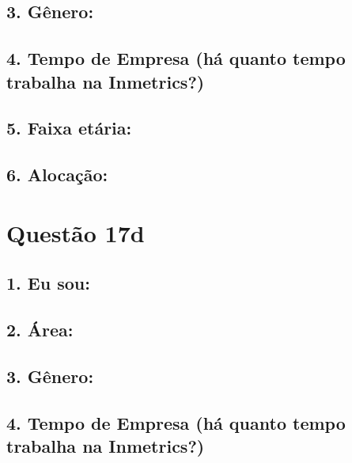 \documentclass[]{book}
\begin{document}
\hypertarget{genero-37}{%
\subsection{3. Gênero:}\label{genero-37}}

\hypertarget{tempo-de-empresa-ha-quanto-tempo-trabalha-na-inmetrics-37}{%
\subsection{4. Tempo de Empresa (há quanto tempo trabalha na Inmetrics?)}\label{tempo-de-empresa-ha-quanto-tempo-trabalha-na-inmetrics-37}}

\hypertarget{faixa-etaria-37}{%
\subsection{5. Faixa etária:}\label{faixa-etaria-37}}

\hypertarget{alocacao-37}{%
\subsection{6. Alocação:}\label{alocacao-37}}

\hypertarget{questao-17d}{%
\section{Questão 17d}\label{questao-17d}}

\hypertarget{eu-sou-38}{%
\subsection{1. Eu sou:}\label{eu-sou-38}}

\hypertarget{area-38}{%
\subsection{2. Área:}\label{area-38}}

\hypertarget{genero-38}{%
\subsection{3. Gênero:}\label{genero-38}}

\hypertarget{tempo-de-empresa-ha-quanto-tempo-trabalha-na-inmetrics-38}{%
\subsection{4. Tempo de Empresa (há quanto tempo trabalha na Inmetrics?)}\label{tempo-de-empresa-ha-quanto-tempo-trabalha-na-inmetrics-38}}
\end{document}
